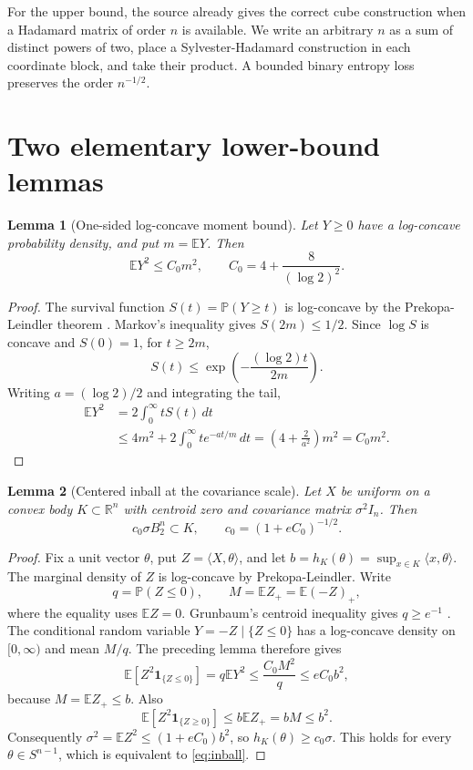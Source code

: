 \documentclass[11pt]{article}
\newtheorem{lemma}{Lemma}
\newcommand{\R}{\mathbb R}
\newcommand{\E}{\mathbb E}
\newcommand{\Prob}{\mathbb P}
\begin{document}
For the upper bound, the source already gives the correct cube construction
when a Hadamard matrix of order $n$ is available.  We write an arbitrary $n$
as a sum of distinct powers of two, place a Sylvester-Hadamard construction in
each coordinate block, and take their product.  A bounded binary entropy loss
preserves the order $n^{-1/2}$.

\section{Two elementary lower-bound lemmas}

\begin{lemma}[One-sided log-concave moment bound]
Let $Y\ge0$ have a log-concave probability density, and put $m=\E Y$.  Then
\begin{equation}
 \E Y^2\le C_0m^2,
 \qquad C_0=4+\frac{8}{(\log2)^2}.
 \label{eq:moment}
\end{equation}
\end{lemma}

\begin{proof}
The survival function $S(t)=\Prob(Y\ge t)$ is log-concave by the
Prekopa-Leindler theorem \cite{Prekopa}.  Markov's inequality gives
$S(2m)\le1/2$.  Since $\log S$ is concave and $S(0)=1$, for $t\ge2m$,
\[
 S(t)\le \exp\left(-\frac{(\log2)t}{2m}\right).
\]
Writing $a=(\log2)/2$ and integrating the tail,
\begin{align*}
 \E Y^2
 &=2\int_0^\infty tS(t)\,dt\\
 &\le4m^2+2\int_0^\infty t e^{-at/m}\,dt
 =\left(4+\frac{2}{a^2}\right)m^2
 =C_0m^2.
\end{align*}
\end{proof}

\begin{lemma}[Centered inball at the covariance scale]
Let $X$ be uniform on a convex body $K\subset\R^n$ with centroid zero and
covariance matrix $\sigma^2I_n$.  Then
\begin{equation}
 c_0\sigma B_2^n\subset K,
 \qquad c_0=(1+eC_0)^{-1/2}.
 \label{eq:inball}
\end{equation}
\end{lemma}

\begin{proof}
Fix a unit vector $\theta$, put $Z=\langle X,\theta\rangle$, and let
$b=h_K(\theta)=\sup_{x\in K}\langle x,\theta\rangle$.  The marginal density
of $Z$ is log-concave by Prekopa-Leindler.  Write
\[
 q=\Prob(Z\le0),\qquad
 M=\E Z_+=\E(-Z)_+,
\]
where the equality uses $\E Z=0$.  Grunbaum's centroid inequality gives
$q\ge e^{-1}$ \cite{Grunbaum,FMY}.  The conditional random variable
$Y=-Z\mid\{Z\le0\}$ has a log-concave density on $[0,\infty)$ and mean
$M/q$.  The preceding lemma therefore gives
\[
 \E[Z^2\mathbf1_{\{Z\le0\}}]
 =q\E Y^2\le \frac{C_0M^2}{q}\le eC_0b^2,
\]
because $M=\E Z_+\le b$.  Also
\[
 \E[Z^2\mathbf1_{\{Z\ge0\}}]\le b\E Z_+=bM\le b^2.
\]
Consequently $\sigma^2=\E Z^2\le(1+eC_0)b^2$, so
$h_K(\theta)\ge c_0\sigma$.  This holds for every $\theta\in S^{n-1}$,
which is equivalent to \eqref{eq:inball}.
\end{proof}
\end{document}
